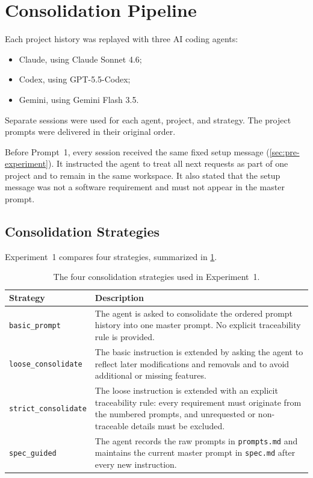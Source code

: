 \section{Consolidation Pipeline}
\label{sec:method-pipeline}

Each project history was replayed with three AI coding agents:

\begin{itemize}[leftmargin=*]
  \item Claude, using Claude Sonnet 4.6;
  \item Codex, using GPT-5.5-Codex;
  \item Gemini, using Gemini Flash 3.5.
\end{itemize}

Separate sessions were used for each agent, project, and strategy. The project
prompts were delivered in their original order.

Before Prompt~1, every session received the same fixed setup message
(\cref{sec:pre-experiment}). It instructed the agent to treat all next
requests as part of one project and to remain in the same workspace. It also
stated that the setup message was not a software requirement and must not
appear in the master prompt.

\subsection{Consolidation Strategies}

Experiment~1 compares four strategies, summarized in
\cref{tab:consolidation-variants}.

\begin{table}[htbp]
  \centering
  \caption{The four consolidation strategies used in Experiment~1.}
  \label{tab:consolidation-variants}
  \begin{tabular}{@{}lp{9.5cm}@{}}
    \toprule
    Strategy & Description \\
    \midrule
    \texttt{basic\_prompt} & The agent is asked to consolidate the ordered
      prompt history into one master prompt. No explicit traceability rule is
      provided. \\
    \texttt{loose\_consolidate} & The basic instruction is extended by asking
      the agent to reflect later modifications and removals and to avoid
      additional or missing features. \\
    \texttt{strict\_consolidate} & The loose instruction is extended with an
      explicit traceability rule: every requirement must originate from the
      numbered prompts, and unrequested or non-traceable details must be excluded. \\
    \texttt{spec\_guided} & The agent records the raw prompts in
      \texttt{prompts.md} and maintains the current master prompt in
      \texttt{spec.md} after every new instruction. \\
    \bottomrule
  \end{tabular}
\end{table}


